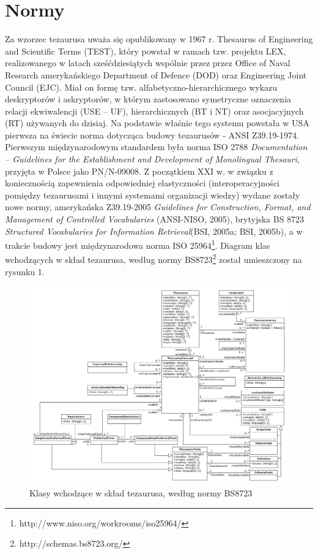 \documentclass[12pt,a4paper,notitlepage]{article}
\begin{document}
\section{Normy}
Za wzorzec tezaurusa uważa się opublikowany w 1967 r. Thesaurus of Engineering and Scientific Terms (TEST), który powstał w ramach tzw. projektu LEX, realizowanego w latach sześćdziesiątych wspólnie przez przez Office of Naval Research amerykańskiego Department of Defence (DOD) oraz Engineering Joint Council (EJC). Miał on formę tzw. alfabetyczno-hierarchicznego wykazu deskryptorów i askryptorów, w którym zastosowano symetryczne oznaczenia relacji ekwiwalencji (USE – UF), hierarchicznych (BT i NT) oraz asocjacyjnych (RT) używanych do dzisiaj\cite{Sosinska}. Na podstawie właśnie tego systemu powstała w USA pierwsza na świecie norma dotycząca budowy tezaurusów - ANSI Z39.19-1974.
Pierwszym międzynarodowym standardem była norma ISO 2788 \textit{Documentation – Guidelines for the Establishment and Development of Monolingual Thesauri}, przyjęta w Polsce jako PN/N-09008. Z początkiem XXI w. w związku z koniecznością zapewnienia odpowiedniej elastyczności (interoperacyjności pomiędzy tezaurusami i innymi systemami organizacji wiedzy) wydane zostały nowe normy, amerykańska Z39.19-2005 \textit{Guidelines for Construction, Format, and Management of Controlled Vocabularies} (ANSI-NISO, 2005), brytyjska BS 8723 \textit{Structured Vocabularies for Information Retrieval}(BSI, 2005a; BSI, 2005b), a w trakcie budowy jest międzynarodowa norma ISO 25964\footnote{http://www.niso.org/workrooms/iso25964/}.
Diagram klas wchodzących w skład tezaurusa, według normy BS8723\footnote{http://schemas.bs8723.org/} został umieszczony na rysunku 1. 

\begin{figure}[ht]
\centering
\includegraphics[width=15cm]{Model.jpg}
\caption{Klasy wchodzące w skład tezaurusa, według normy BS8723}
\end{figure}
\end{document}
